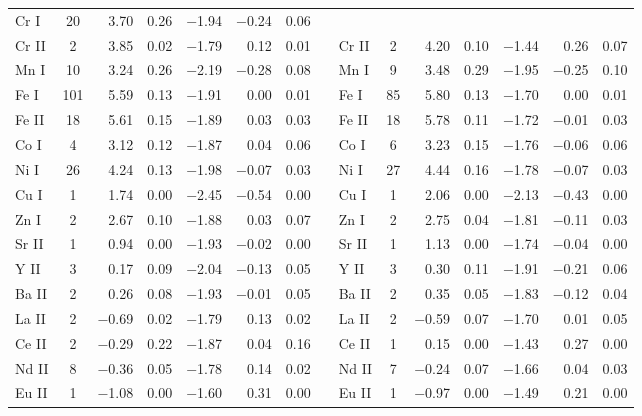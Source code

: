 \documentclass{emulateapj}
\begin{document}
\begin{longtable*}{lcrcrrcclcrcrrc}
  Cr \textsc{I} &  20 &    3.70 &    0.26 & $-$1.94 & $-$0.24 &    0.06 \\
 Cr \textsc{II} &   2 &    3.85 &    0.02 & $-$1.79 &    0.12 &    0.01 &&
 Cr \textsc{II} &   2 &    4.20 &    0.10 & $-$1.44 &    0.26 &    0.07 \\
  Mn \textsc{I} &  10 &    3.24 &    0.26 & $-$2.19 & $-$0.28 &    0.08 &&
  Mn \textsc{I} &   9 &    3.48 &    0.29 & $-$1.95 & $-$0.25 &    0.10 \\
  Fe \textsc{I} & 101 &    5.59 &    0.13 & $-$1.91 &    0.00 &    0.01 &&
  Fe \textsc{I} &  85 &    5.80 &    0.13 & $-$1.70 &    0.00 &    0.01 \\
 Fe \textsc{II} &  18 &    5.61 &    0.15 & $-$1.89 &    0.03 &    0.03 &&
 Fe \textsc{II} &  18 &    5.78 &    0.11 & $-$1.72 & $-$0.01 &    0.03 \\
  Co \textsc{I} &   4 &    3.12 &    0.12 & $-$1.87 &    0.04 &    0.06 &&
  Co \textsc{I} &   6 &    3.23 &    0.15 & $-$1.76 & $-$0.06 &    0.06 \\
  Ni \textsc{I} &  26 &    4.24 &    0.13 & $-$1.98 & $-$0.07 &    0.03 &&
  Ni \textsc{I} &  27 &    4.44 &    0.16 & $-$1.78 & $-$0.07 &    0.03 \\
  Cu \textsc{I} &   1 &    1.74 &    0.00 & $-$2.45 & $-$0.54 &    0.00 &&
  Cu \textsc{I} &   1 &    2.06 &    0.00 & $-$2.13 & $-$0.43 &    0.00 \\
  Zn \textsc{I} &   2 &    2.67 &    0.10 & $-$1.88 &    0.03 &    0.07 &&
  Zn \textsc{I} &   2 &    2.75 &    0.04 & $-$1.81 & $-$0.11 &    0.03 \\
 Sr \textsc{II} &   1 &    0.94 &    0.00 & $-$1.93 & $-$0.02 &    0.00 &&
 Sr \textsc{II} &   1 &    1.13 &    0.00 & $-$1.74 & $-$0.04 &    0.00 \\
  Y \textsc{II} &   3 &    0.17 &    0.09 & $-$2.04 & $-$0.13 &    0.05 &&
  Y \textsc{II} &   3 &    0.30 &    0.11 & $-$1.91 & $-$0.21 &    0.06 \\
 Ba \textsc{II} &   2 &    0.26 &    0.08 & $-$1.93 & $-$0.01 &    0.05 &&
 Ba \textsc{II} &   2 &    0.35 &    0.05 & $-$1.83 & $-$0.12 &    0.04 \\
 La \textsc{II} &   2 & $-$0.69 &    0.02 & $-$1.79 &    0.13 &    0.02 &&
 La \textsc{II} &   2 & $-$0.59 &    0.07 & $-$1.70 &    0.01 &    0.05 \\
 Ce \textsc{II} &   2 & $-$0.29 &    0.22 & $-$1.87 &    0.04 &    0.16 &&
 Ce \textsc{II} &   1 &    0.15 &    0.00 & $-$1.43 &    0.27 &    0.00 \\
 Nd \textsc{II} &   8 & $-$0.36 &    0.05 & $-$1.78 &    0.14 &    0.02 &&
 Nd \textsc{II} &   7 & $-$0.24 &    0.07 & $-$1.66 &    0.04 &    0.03 \\
 Eu \textsc{II} &   1 & $-$1.08 &    0.00 & $-$1.60 &    0.31 &    0.00 &&
 Eu \textsc{II} &   1 & $-$0.97 &    0.00 & $-$1.49 &    0.21 &    0.00 \\



\end{longtable*}
\end{document}
